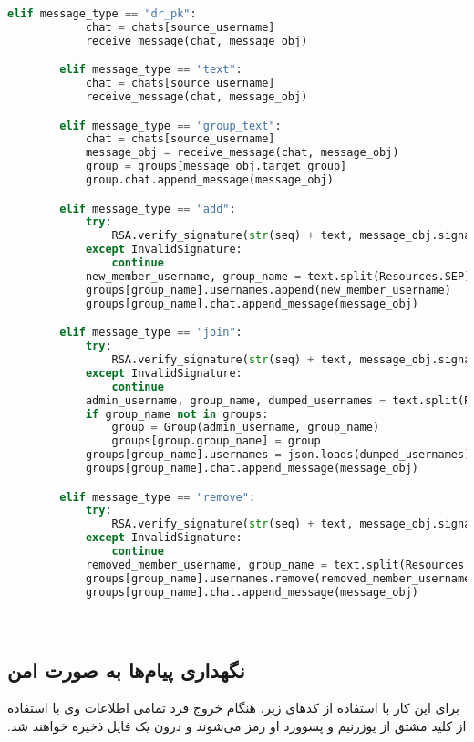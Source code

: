 \begin{latin}
\begin{lstlisting}[firstnumber=441, language=Python]
        elif message_type == "dr_pk":
            chat = chats[source_username]
            receive_message(chat, message_obj)

        elif message_type == "text":
            chat = chats[source_username]
            receive_message(chat, message_obj)

        elif message_type == "group_text":
            chat = chats[source_username]
            message_obj = receive_message(chat, message_obj)
            group = groups[message_obj.target_group]
            group.chat.append_message(message_obj)

        elif message_type == "add":
            try:
                RSA.verify_signature(str(seq) + text, message_obj.signature, server_public_key)
            except InvalidSignature:
                continue
            new_member_username, group_name = text.split(Resources.SEP)
            groups[group_name].usernames.append(new_member_username)
            groups[group_name].chat.append_message(message_obj)

        elif message_type == "join":
            try:
                RSA.verify_signature(str(seq) + text, message_obj.signature, server_public_key)
            except InvalidSignature:
                continue
            admin_username, group_name, dumped_usernames = text.split(Resources.SEP)
            if group_name not in groups:
                group = Group(admin_username, group_name)
                groups[group.group_name] = group
            groups[group_name].usernames = json.loads(dumped_usernames)
            groups[group_name].chat.append_message(message_obj)

        elif message_type == "remove":
            try:
                RSA.verify_signature(str(seq) + text, message_obj.signature, server_public_key)
            except InvalidSignature:
                continue
            removed_member_username, group_name = text.split(Resources.SEP)
            groups[group_name].usernames.remove(removed_member_username)
            groups[group_name].chat.append_message(message_obj)

\end{lstlisting}
\end{latin}
‫
‫\subsection{نگهداری پیام‌ها به صورت امن}
‫برای این کار با استفاده از کدهای زیر، هنگام خروج فرد تمامی اطلاعات وی با استفاده از کلید مشتق از یوزرنیم و پسوورد او رمز می‌شوند و درون یک فایل ذخیره خواهند شد.
